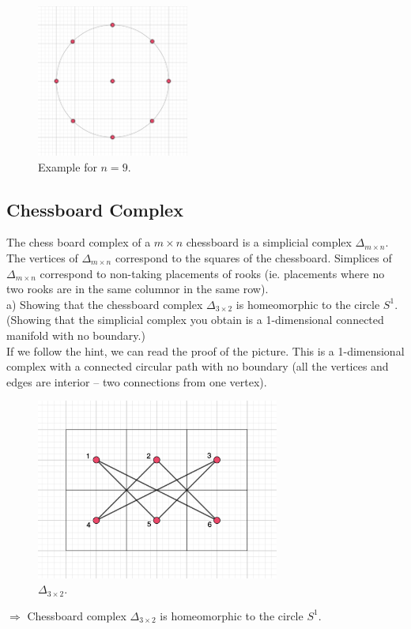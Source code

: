 \documentclass[a4paper,11pt]{article}
\begin{document}
\begin{figure}[ht!]
    \centering
    \includegraphics[width=50mm]{1_3.png}
    \caption{Example for $n = 9$.}
\end{figure}


\subsection{Chessboard Complex}
The chess board complex of a $m \times n$ chessboard is a simplicial complex $\Delta_{m \times n}$. The vertices of $\Delta_{m \times n}$ correspond to the squares of the chessboard. Simplices of $\Delta_{m \times n}$ correspond to non-taking placements of rooks (ie. placements where no two rooks are in the same columnor in the same row).
\\


\noindent
a) Showing that the chessboard complex $\Delta_{3 \times 2}$ is homeomorphic to the circle $S^1$.  (Showing that the simplicial complex you obtain is a 1-dimensional connected manifold with no boundary.)
\\
If we follow the hint, we can read the proof of the picture. This is a 1-dimensional complex with a connected circular path with no boundary (all the vertices and edges are interior -- two connections from one vertex). 

\begin{figure}[ht!]
    \centering
    \includegraphics[width=80mm]{1_4_a.png}
    \caption{$\Delta_{3 \times 2}$.}
\end{figure}
\noindent 
$\Rightarrow$ Chessboard complex $\Delta_{3 \times 2}$ is homeomorphic to the circle $S^1$.
\\
\\
\end{document}

